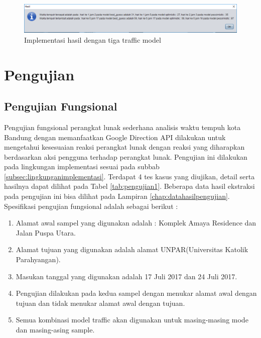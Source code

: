 \begin{figure}[H]
				\centering		
				\includegraphics[scale=0.5]{Gambar/gui5.png}
				\caption[Implementasi hasil dengan tiga traffic model]{Implementasi hasil dengan tiga traffic model}
				\label{fig:implementasihasil3}	
			\end{figure}

\section{Pengujian}
\label{sec:pengujian}

\subsection{Pengujian Fungsional}
\label{subsec:pengujianfungsional}

Pengujian fungsional perangkat lunak sederhana analisis waktu tempuh kota Bandung dengan memanfaatkan Google Direction API dilakukan untuk mengetahui kesesuaian reaksi perangkat lunak dengan reaksi yang diharapkan berdasarkan aksi pengguna terhadap perangkat lunak. Pengujian ini dilakukan pada lingkungan implementasi sesuai pada subbab \ref{subsec:lingkunganimplementasi}. Terdapat 4 tes kasus yang diujikan, detail serta hasilnya dapat dilihat pada Tabel \ref{tab:pengujian1}. Beberapa data hasil ekstraksi pada pengujian ini bisa dilihat pada Lampiran \ref{chap:datahasilpengujian}. Spesifikasi pengujian fungsional adalah sebagai berikut :
\begin{enumerate}
	\item Alamat awal sampel yang digunakan adalah : Komplek Amaya Residence dan Jalan Puspa Utara.
	\item Alamat tujuan yang digunakan adalah alamat UNPAR(Universitas Katolik Parahyangan).
	\item Masukan tanggal yang digunakan adalah 17 Juli 2017 dan 24 Juli 2017.
	\item Pengujian dilakukan pada kedua sampel dengan menukar alamat awal dengan tujuan dan tidak menukar alamat awal dengan tujuan.
	\item Semua kombinasi model traffic akan digunakan untuk masing-masing mode dan masing-asing sample.
\end{enumerate}

